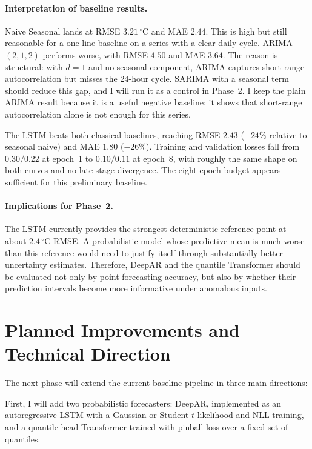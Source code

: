 \documentclass[11pt,a4paper]{article}
\begin{document}
\paragraph{Interpretation of baseline results.}
Naive Seasonal lands at RMSE $3.21$\,$^\circ$C and MAE $2.44$. This is
high but still reasonable for a one-line baseline on a series with a
clear daily cycle. ARIMA$(2,1,2)$ performs worse, with RMSE $4.50$ and
MAE $3.64$. The reason is structural: with $d=1$ and no seasonal
component, ARIMA captures short-range autocorrelation but misses the
24-hour cycle. SARIMA with a seasonal term should reduce this gap, and I
will run it as a control in Phase~2. I keep the plain ARIMA result
because it is a useful negative baseline: it shows that short-range
autocorrelation alone is not enough for this series.

The LSTM beats both classical baselines, reaching RMSE $2.43$
($-24\%$ relative to seasonal naive) and MAE $1.80$ ($-26\%$). Training
and validation losses fall from $0.30/0.22$ at epoch~1 to $0.10/0.11$
at epoch~8, with roughly the same shape on both curves and no late-stage
divergence. The eight-epoch budget appears sufficient for this
preliminary baseline.

\paragraph{Implications for Phase~2.}
The LSTM currently provides the strongest deterministic reference point
at about $2.4$\,$^\circ$C RMSE. A probabilistic model whose predictive
mean is much worse than this reference would need to justify itself
through substantially better uncertainty estimates. Therefore, DeepAR
and the quantile Transformer should be evaluated not only by point
forecasting accuracy, but also by whether their prediction intervals
become more informative under anomalous inputs.

\section{Planned Improvements and Technical Direction}

The next phase will extend the current baseline pipeline in three main directions:

First, I will add two probabilistic forecasters: DeepAR, implemented as an
autoregressive LSTM with a Gaussian or Student-$t$ likelihood and NLL training,
and a quantile-head Transformer trained with pinball loss over a fixed set of
quantiles.
\end{document}
